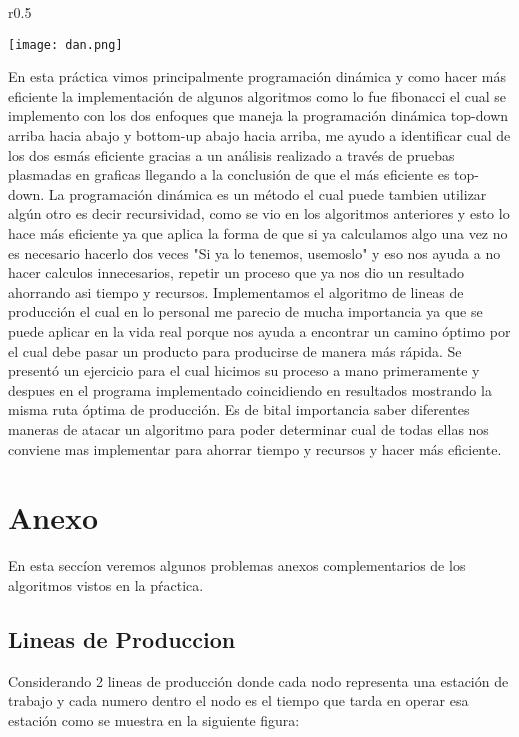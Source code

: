 \documentclass[12pt,twoside]{article}
\begin{document}
\begin{wrapfigure}{r}{0.5\textwidth}
  \begin{center}
    \texttt{[image: dan.png]}
\end{center}
\end{wrapfigure}
En esta práctica vimos principalmente programación dinámica y como hacer más eficiente la implementación de algunos algoritmos como lo fue fibonacci el cual se implemento con los dos enfoques que maneja la programación dinámica top-down arriba hacia abajo y bottom-up abajo hacia arriba, me ayudo a identificar cual de los dos esmás eficiente gracias a un análisis
realizado a través de pruebas plasmadas en graficas llegando a la conclusión de que el más eficiente es top-down.
La programación dinámica es un método el cual puede tambien utilizar algún otro es decir recursividad, como se vio en los algoritmos anteriores y esto lo hace más eficiente ya que aplica la forma de que si ya calculamos algo una vez no es necesario hacerlo dos veces "Si ya lo tenemos, usemoslo" y eso nos ayuda a no hacer calculos innecesarios, repetir un proceso que ya nos dio un resultado ahorrando asi tiempo y recursos.
Implementamos el algoritmo de lineas de producción el cual en lo personal me parecio de mucha importancia ya que se puede aplicar en la vida real porque nos ayuda a encontrar un camino óptimo por el cual debe pasar un producto para producirse de manera más rápida. Se presentó un ejercicio para el cual hicimos su proceso a mano primeramente y despues en el programa implementado coincidiendo en resultados mostrando la misma ruta óptima de producción.
Es de bital importancia saber diferentes maneras de atacar un algoritmo para poder determinar cual de todas ellas nos conviene mas implementar para ahorrar tiempo y recursos y hacer más eficiente.
\newpage
\section{Anexo}
En  esta  seccíon  veremos  algunos  problemas  anexos complementarios  de  los algoritmos  vistos  en la  pŕactica.
\subsection{Lineas de Produccion}
Considerando 2 lineas de producción donde cada nodo representa una estación de trabajo y cada numero dentro el nodo es el tiempo que tarda en operar esa estación como se muestra en la siguiente figura: \\
\end{document}
